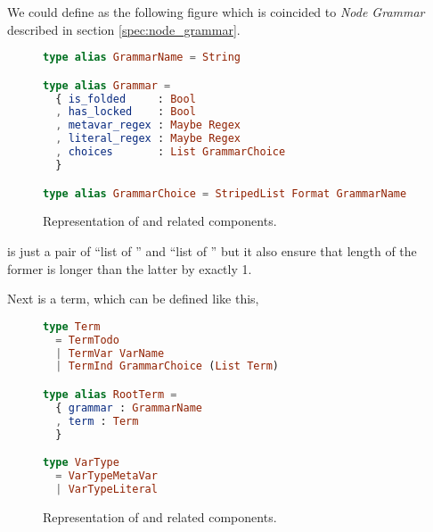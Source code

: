 \documentclass[master.tex]{subfiles}
\begin{document}
\newpage

We could define  as the following figure which is coincided to
\emph{Node Grammar} described in section \ref{spec:node_grammar}.

\begin{figure}[H]
\begin{framed}
\begin{lstlisting}[language=elm]
type alias GrammarName = String

type alias Grammar =
  { is_folded     : Bool
  , has_locked    : Bool
  , metavar_regex : Maybe Regex
  , literal_regex : Maybe Regex
  , choices       : List GrammarChoice
  }

type alias GrammarChoice = StripedList Format GrammarName
\end{lstlisting}
\end{framed}
\caption{Representation of  and related components.}
\label{fig:implementation-repo-grammar}
\end{figure}

\vspace{-1em}

 is just a pair of ``list of
'' and ``list of '' but it also ensure that
length of the former is longer than the latter by exactly 1.

Next is a term, which can be defined like this,

\begin{figure}[H]
\begin{framed}
\begin{lstlisting}[language=elm]
type Term
  = TermTodo
  | TermVar VarName
  | TermInd GrammarChoice (List Term)

type alias RootTerm =
  { grammar : GrammarName
  , term : Term
  }

type VarType
  = VarTypeMetaVar
  | VarTypeLiteral
\end{lstlisting}
\end{framed}
\caption{Representation of  and related components.}
\label{fig:implementation-repo-term}
\end{figure}
\end{document}
